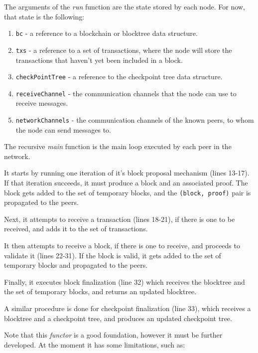 The arguments of the \textit{run} function are the state stored by each node. For now, that state is the following:

\begin{enumerate}
  \item \texttt{bc} - a reference to a blockchain or blocktree data structure.
  \item \texttt{txs} - a reference to a set of transactions, where the node will store the transactions that haven't yet been included in a block.
  \item \texttt{checkPointTree} - a reference to the checkpoint tree data structure.
  \item \texttt{receiveChannel} - the communication channels that the node can use to receive messages.
  \item \texttt{networkChannels} - the communication channels of the known peers, to whom the node can send messages to.
\end{enumerate}

The recursive \textit{main} function is the main loop executed by each peer in the network.

It starts by running one iteration of it's block proposal mechanism (lines 13-17). If that iteration succeeds, it must produce a block and an associated proof. The block gets added to the set of temporary blocks, and the \texttt{(block, proof)} pair is propagated to the peers.

Next, it attempts to receive a transaction (lines 18-21), if there is one to be received, and adds it to the set of transactions.

It then attempts to receive a block, if there is one to receive, and proceeds to validate it (lines 22-31). If the block is valid, it gets added to the set of temporary blocks and propagated to the peers.

Finally, it executes block finalization (line 32) which receives the blocktree and the set of temporary blocks, and returns an updated blocktree.

A similar procedure is done for checkpoint finalization (line 33), which receives a blocktree and a checkpoint tree, and produces an updated checkpoint tree.

\vspace{0.75cm}

Note that this \textit{functor} is a good foundation, however it must be further developed. At the moment it has some limitations, such as:

